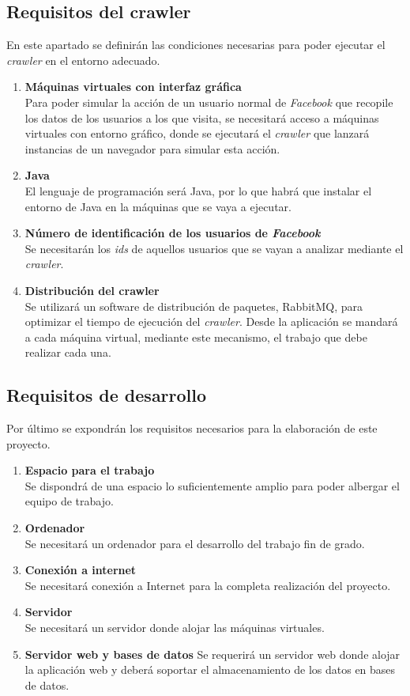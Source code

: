 \subsection{Requisitos del crawler}
En este apartado se definirán las condiciones necesarias para poder ejecutar el \textit{crawler} en el entorno adecuado.
\begin{enumerate} \itemsep4pt \parskip0pt
\item \textbf{Máquinas virtuales con interfaz gráfica}\\
Para poder simular la acción de un usuario normal de \textit{Facebook} que recopile los datos de los usuarios a los que visita, se necesitará acceso a máquinas virtuales con entorno gráfico, donde se ejecutará el \textit{crawler} que lanzará instancias de un navegador para simular esta acción.
\item \textbf{Java} \\
El lenguaje de programación será Java, por lo que habrá que instalar el entorno de Java en la máquinas que se vaya a ejecutar. 
\item  \textbf{Número de identificación de los usuarios de \textit{Facebook}} \\
Se necesitarán los \textit{ids} de aquellos usuarios que se vayan a analizar mediante el \textit{crawler}.
\item  \textbf{Distribución del crawler} \\
Se utilizará un software de distribución de paquetes, RabbitMQ, para optimizar el tiempo de ejecución del \textit{crawler}. Desde la aplicación se mandará a cada máquina virtual, mediante este mecanismo, el trabajo que debe realizar cada una.
\end{enumerate}

\subsection{Requisitos de desarrollo}
Por último se expondrán los requisitos necesarios para la elaboración de este proyecto.
\begin{enumerate} \itemsep4pt \parskip0pt
\item \textbf{Espacio para el trabajo} \\
Se dispondrá de una espacio lo suficientemente amplio para poder albergar el equipo de trabajo.
\item \textbf{Ordenador} \\
Se necesitará un ordenador para el desarrollo del trabajo fin de grado.
\item \textbf{Conexión a internet} \\
Se necesitará conexión a Internet para la completa realización del proyecto.
\item \textbf{Servidor} \\
Se necesitará un servidor donde alojar las máquinas virtuales.
\item \textbf{Servidor web y bases de datos}
Se requerirá un servidor web donde alojar la aplicación web y deberá soportar el almacenamiento de los datos en bases de datos. 
\end{enumerate}

